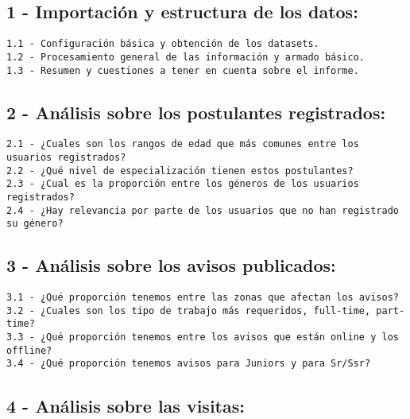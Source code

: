 \documentclass[11pt]{article}
\begin{document}
\hypertarget{importaciuxf3n-y-estructura-de-los-datos}{%
\subsection{1 - Importación y estructura de los
datos:}\label{importaciuxf3n-y-estructura-de-los-datos}}

\begin{verbatim}
1.1 - Configuración básica y obtención de los datasets.
1.2 - Procesamiento general de las información y armado básico.
1.3 - Resumen y cuestiones a tener en cuenta sobre el informe.
\end{verbatim}

\hypertarget{anuxe1lisis-sobre-los-postulantes-registrados}{%
\subsection{2 - Análisis sobre los postulantes
registrados:}\label{anuxe1lisis-sobre-los-postulantes-registrados}}

\begin{verbatim}
2.1 - ¿Cuales son los rangos de edad que más comunes entre los usuarios registrados?
2.2 - ¿Qué nivel de especialización tienen estos postulantes?
2.3 - ¿Cual es la proporción entre los géneros de los usuarios registrados?
2.4 - ¿Hay relevancia por parte de los usuarios que no han registrado su género?
\end{verbatim}

\hypertarget{anuxe1lisis-sobre-los-avisos-publicados}{%
\subsection{3 - Análisis sobre los avisos
publicados:}\label{anuxe1lisis-sobre-los-avisos-publicados}}

\begin{verbatim}
3.1 - ¿Qué proporción tenemos entre las zonas que afectan los avisos?
3.2 - ¿Cuales son los tipo de trabajo más requeridos, full-time, part-time?
3.3 - ¿Qué proporción tenemos entre los avisos que están online y los offline?
3.4 - ¿Qué proporción tenemos avisos para Juniors y para Sr/Ssr?
\end{verbatim}

\hypertarget{anuxe1lisis-sobre-las-visitas}{%
\subsection{4 - Análisis sobre las
visitas:}\label{anuxe1lisis-sobre-las-visitas}}
\end{document}
